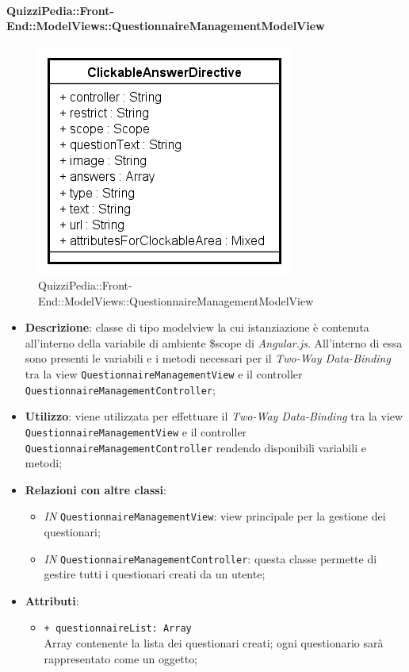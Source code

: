 	\paragraph{QuizziPedia::Front-End::ModelViews::QuestionnaireManagementModelView}
	
	\label{QuizziPedia::Front-End::ModelViews::QuestionnaireManagementModelView}
	
	\begin{figure}[ht]
		\centering
		\includegraphics[scale=0.5,keepaspectratio]{UML/Classi/Front-End/QuizziPedia_Front-end_Templates_ClickableAnswerTemplate.png}
		\caption{QuizziPedia::Front-End::ModelViews::QuestionnaireManagementModelView}
	\end{figure} \FloatBarrier
	
	\begin{itemize}
		\item \textbf{Descrizione}: classe di tipo modelview la cui istanziazione è contenuta all'interno della variabile di ambiente \$scope di \textit{Angular.js}. All'interno di essa sono presenti le variabili e i metodi necessari per il \textit{Two-Way Data-Binding} tra la view \texttt{QuestionnaireManagementView} e il controller \texttt{QuestionnaireManagementController};
		\item \textbf{Utilizzo}: viene utilizzata per effettuare il \textit{Two-Way Data-Binding} tra la view \texttt{QuestionnaireManagementView} e il controller \texttt{QuestionnaireManagementController} rendendo disponibili variabili e metodi;
		\item \textbf{Relazioni con altre classi}: 
		\begin{itemize}
			\item \textit{IN} \texttt{QuestionnaireManagementView}: view principale per la gestione dei questionari; 
			\item \textit{IN} \texttt{QuestionnaireManagementController}: questa classe permette di gestire tutti i questionari creati da un utente;
		\end{itemize}
		\item \textbf{Attributi}: 
		\begin{itemize}
			\item \texttt{+ questionnaireList: Array} \\ Array contenente la lista dei questionari creati; ogni questionario sarà rappresentato come un oggetto;
		\end{itemize}
	\end{itemize}
	
